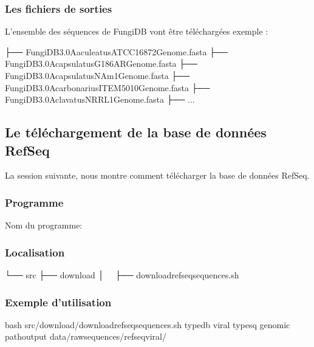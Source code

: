 \documentclass[letterpaper,10pt,french]{sphinxmanual}
\begin{document}
\subsubsection{Les fichiers de sorties}
\label{\detokenize{tutorial:id13}}
L’ensemble des séquences de FungiDB vont être téléchargées exemple :

\begin{sphinxVerbatim}[commandchars=\\\{\}]
├── FungiDB\PYGZhy{}3.0\PYGZus{}Aaculeatus\PYGZus{}ATCC16872\PYGZus{}Genome.fasta
├── FungiDB\PYGZhy{}3.0\PYGZus{}Acapsulatus\PYGZus{}G186AR\PYGZus{}Genome.fasta
├── FungiDB\PYGZhy{}3.0\PYGZus{}Acapsulatus\PYGZus{}NAm1\PYGZus{}Genome.fasta
├── FungiDB\PYGZhy{}3.0\PYGZus{}Acarbonarius\PYGZus{}ITEM5010\PYGZus{}Genome.fasta
├── FungiDB\PYGZhy{}3.0\PYGZus{}Aclavatus\PYGZus{}NRRL1\PYGZus{}Genome.fasta
├── ...
\end{sphinxVerbatim}


\subsection{Le téléchargement de la base de données RefSeq}
\label{\detokenize{tutorial:le-telechargement-de-la-base-de-donnees-refseq}}\label{\detokenize{tutorial:download-refseq}}
La session suivante, nous montre comment télécharger la base de données RefSeq.


\subsubsection{Programme}
\label{\detokenize{tutorial:id14}}
Nom du programme:

\begin{sphinxVerbatim}[commandchars=\\\{\}]
\end{sphinxVerbatim}


\subsubsection{Localisation}
\label{\detokenize{tutorial:id15}}
\begin{sphinxVerbatim}[commandchars=\\\{\}]
└── src
 ├── download
 │   ├── download\PYGZus{}refseq\PYGZus{}sequences.sh
\end{sphinxVerbatim}


\subsubsection{Exemple d’utilisation}
\label{\detokenize{tutorial:id16}}
\begin{sphinxVerbatim}[commandchars=\\\{\}]
bash src/download/download\PYGZus{}refseq\PYGZus{}sequences.sh 
     \PYGZhy{}type\PYGZus{}db viral 
     \PYGZhy{}type\PYGZus{}sq genomic 
     \PYGZhy{}path\PYGZus{}output data/raw\PYGZus{}sequences/refseq\PYGZus{}viral/
\end{sphinxVerbatim}
\end{document}
